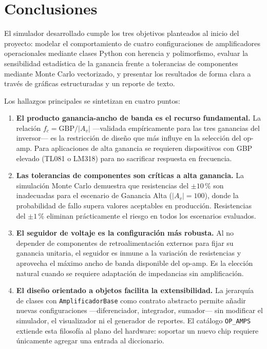 ﻿\documentclass[12pt, letterpaper]{article}
\begin{document}
\section{Conclusiones}

El simulador desarrollado cumple los tres objetivos planteados al inicio del
proyecto: modelar el comportamiento de cuatro configuraciones de amplificadores
operacionales mediante clases Python con herencia y polimorfismo, evaluar la
sensibilidad estadística de la ganancia frente a tolerancias de componentes
mediante Monte Carlo vectorizado, y presentar los resultados de forma clara a
través de gráficas estructuradas y un reporte de texto.

Los hallazgos principales se sintetizan en cuatro puntos:

\begin{enumerate}[leftmargin=2em]
    \item \textbf{El producto ganancia-ancho de banda es el recurso fundamental.}
          La relación \(f_c = \mathrm{GBP}/|A_v|\) —validada empíricamente para
          las tres ganancias del inversor— es la restricción de diseño que más
          influye en la selección del op-amp. Para aplicaciones de alta ganancia
          se requieren dispositivos con GBP elevado (TL081 o LM318) para no
          sacrificar respuesta en frecuencia.

    \item \textbf{Las tolerancias de componentes son críticas a alta ganancia.}
          La simulación Monte Carlo demuestra que resistencias del \(\pm 10\,\text{\%}\)
          son inadecuadas para el escenario de Ganancia Alta (\(|A_v| = 100\)),
          donde la probabilidad de fallo supera valores aceptables en producción.
          Resistencias del \(\pm 1\,\text{\%}\) eliminan prácticamente el riesgo
          en todos los escenarios evaluados.

    \item \textbf{El seguidor de voltaje es la configuración más robusta.}
          Al no depender de componentes de retroalimentación externos para fijar
          su ganancia unitaria, el seguidor es inmune a la variación de
          resistencias y aprovecha el máximo ancho de banda disponible del
          op-amp. Es la elección natural cuando se requiere adaptación de
          impedancias sin amplificación.

    \item \textbf{El diseño orientado a objetos facilita la extensibilidad.}
          La jerarquía de clases con \texttt{AmplificadorBase} como contrato
          abstracto permite añadir nuevas configuraciones —diferenciador,
          integrador, sumador— sin modificar el simulador, el visualizador ni
          el generador de reportes. El catálogo \texttt{OP\_AMPS} extiende esta
          filosofía al plano del hardware: soportar un nuevo chip requiere
          únicamente agregar una entrada al diccionario.
\end{enumerate}
\end{document}
